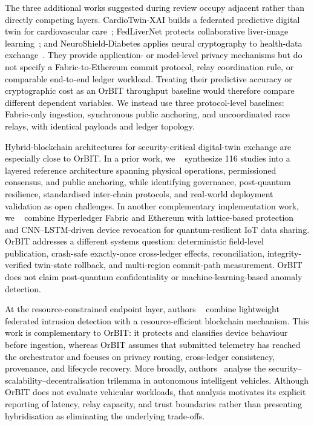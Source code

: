 \documentclass[final,5p,times,twocolumn]{elsarticle}
\begin{document}
\textcolor{black}{The three additional works suggested during review occupy adjacent rather than directly competing layers. CardioTwin-XAI builds a federated predictive digital twin for cardiovascular care~\cite{yang2026cardiotwin}; FedLiverNet protects collaborative liver-image learning~\cite{lou2026fedlivernet}; and NeuroShield-Diabetes applies neural cryptography to health-data exchange~\cite{yang2026neuroshield}. They provide application- or model-level privacy mechanisms but do not specify a Fabric-to-Ethereum commit protocol, relay coordination rule, or comparable end-to-end ledger workload. Treating their predictive accuracy or cryptographic cost as an OrBIT throughput baseline would therefore compare different dependent variables. We instead use three protocol-level baselines: Fabric-only ingestion, synchronous public anchoring, and uncoordinated race relays, with identical payloads and ledger topology.}

\textcolor{black}{Hybrid-blockchain architectures for security-critical digital-twin exchange are especially close to OrBIT. In a prior work, we ~\cite{amadi2026security} synthesize 116 studies into a layered reference architecture spanning physical operations, permissioned consensus, and public anchoring, while identifying governance, post-quantum resilience, standardised inter-chain protocols, and real-world deployment validation as open challenges. In another complementary implementation work, we ~\cite{amadi2026symmetric} combine Hyperledger Fabric and Ethereum with lattice-based protection and CNN--LSTM-driven device revocation for quantum-resilient IoT data sharing. OrBIT addresses a different systems question: deterministic field-level publication, crash-safe exactly-once cross-ledger effects, reconciliation, integrity-verified twin-state rollback, and multi-region commit-path measurement. OrBIT does not claim post-quantum confidentiality or machine-learning-based anomaly detection.}

\textcolor{black}{At the resource-constrained endpoint layer, authors ~\cite{amadi2026lightweight} combine lightweight federated intrusion detection with a resource-efficient blockchain mechanism. This work is complementary to OrBIT: it protects and classifies device behaviour before ingestion, whereas OrBIT assumes that submitted telemetry has reached the orchestrator and focuses on privacy routing, cross-ledger consistency, provenance, and lifecycle recovery. More broadly, authors~\cite{amadi2026blockchain} analyse the security--scalability--decentralisation trilemma in autonomous intelligent vehicles. Although OrBIT does not evaluate vehicular workloads, that analysis motivates its explicit reporting of latency, relay capacity, and trust boundaries rather than presenting hybridisation as eliminating the underlying trade-offs.}
\end{document}

